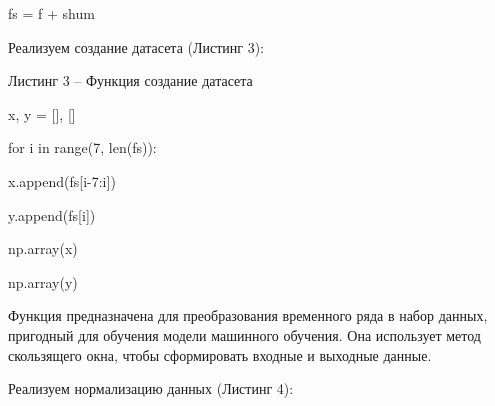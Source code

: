 \documentclass{article}%
\begin{document}
\begin{enumerate}
\begin{flushleft}
fs = f + shum%
%
\end{flushleft}%
\begin{flushleft}%
Реализуем создание датасета (Листинг 3):%
%
\end{flushleft}%
\begin{flushleft}%
Листинг 3 – Функция создание датасета%
%
\end{flushleft}%
\begin{flushleft}%
x, y = [], []%
%
\end{flushleft}%
\begin{flushleft}%
for i in range(7, len(fs)):%
%
\end{flushleft}%
\begin{flushleft}%
    x.append(fs[i-7:i])%
%
\end{flushleft}%
\begin{flushleft}%
    y.append(fs[i])%
%
\end{flushleft}%
\begin{flushleft}%
np.array(x)%
%
\end{flushleft}%
\begin{flushleft}%
np.array(y)%
%
\end{flushleft}%
\begin{flushleft}%
Функция предназначена для преобразования временного ряда в набор данных, пригодный для обучения модели машинного обучения. Она использует метод скользящего окна, чтобы сформировать входные и выходные данные.%
%
\end{flushleft}%
\begin{flushleft}%
Реализуем нормализацию данных (Листинг 4):%
%

\end{flushleft}
\end{enumerate}
\end{document}
